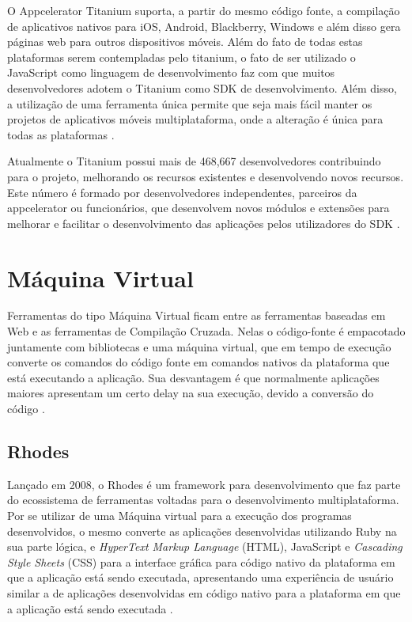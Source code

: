 O Appcelerator Titanium suporta, a partir do mesmo código fonte, a compilação de aplicativos nativos para iOS, Android, Blackberry, Windows e além disso gera páginas web para outros dispositivos móveis. Além do fato de todas estas plataformas serem contempladas pelo titanium, o fato de ser utilizado o JavaScript como linguagem de desenvolvimento faz com que muitos desenvolvedores adotem o Titanium como SDK de desenvolvimento. Além disso, a utilização de uma ferramenta única permite que seja mais fácil manter os projetos de aplicativos móveis multiplataforma, onde a alteração é única para todas as plataformas \cite{appceleratorTitanium}.

Atualmente o Titanium possui mais de 468,667 desenvolvedores contribuindo para o projeto, melhorando os recursos existentes e desenvolvendo novos recursos. Este número é formado por desenvolvedores independentes, parceiros da appcelerator ou funcionários, que desenvolvem novos módulos e extensões para melhorar e facilitar o desenvolvimento das aplicações pelos utilizadores do SDK \cite{appceleratorTitanium}.

\section{Máquina Virtual}
Ferramentas do tipo Máquina Virtual ficam entre as ferramentas baseadas em Web e as ferramentas de Compilação Cruzada. Nelas o código-fonte é empacotado juntamente com bibliotecas e uma máquina virtual, que em tempo de execução converte os comandos do código fonte em comandos nativos da plataforma que está executando a aplicação. Sua desvantagem é que normalmente aplicações maiores apresentam um certo delay na sua execução, devido a conversão do código
\cite{CrossPlatformMobileDevelopment2011}.

\subsection{Rhodes}
Lançado em 2008, o Rhodes é um framework para desenvolvimento que faz parte do ecossistema de ferramentas voltadas para o desenvolvimento multiplataforma. Por se utilizar de uma Máquina virtual para a execução dos programas desenvolvidos, o mesmo converte as aplicações desenvolvidas utilizando Ruby na sua parte lógica, e \emph{HyperText Markup Language} (HTML), JavaScript e \emph{Cascading Style Sheets} (CSS) para a interface gráfica para código nativo da plataforma em que a aplicação está sendo executada, apresentando uma experiência de usuário similar a de aplicações desenvolvidas em código nativo para a plataforma em que a aplicação está sendo executada
\cite{CrossPlatformMobileDevelopment2011}.

